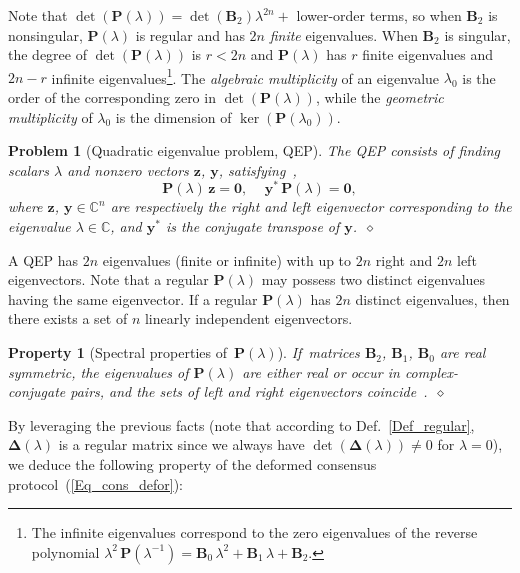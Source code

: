 \documentclass[letterpaper,9pt,twocolumn]{autart}
\newcommand{\vet}[1]{\ensuremath{{\mathbf #1}}}
\newtheorem{problem}{\textbf{Problem}}
\newtheorem{property}{\textbf{Property}}
\begin{document}
Note that $\det(\vet{P}(\lambda)) = \det(\vet{B}_2)\lambda^{2n} +$
lower-order terms, so when $\vet{B}_2$ is nonsingular, $\vet{P}(\lambda)$ is regular and has
$2n$ \emph{finite} eigenvalues. When $\vet{B}_2$ is singular, the degree of
$\det(\vet{P}(\lambda))$ is $r < 2n$ and $\vet{P}(\lambda)$ has $r$ finite eigenvalues and
$2n - r$ infinite eigenvalues\footnote{The infinite eigenvalues correspond to the zero eigenvalues
of the reverse polynomial $\lambda^2\,\vet{P}(\lambda^{-1}) =
\vet{B}_0\,\lambda^2 + \vet{B}_1\,\lambda + \vet{B}_2$.}.
The \emph{algebraic multiplicity} of an eigenvalue $\lambda_0$ is the order of the corresponding
zero in $\det(\vet{P}(\lambda))$, while the \emph{geometric multiplicity} of
$\lambda_0$ is the dimension of $\ker(\vet{P}(\lambda_0))$.

\begin{problem}[Quadratic eigenvalue problem, QEP]
The QEP consists of finding scalars $\lambda$ and nonzero vectors $\vet{z}$, $\vet{y}$,
satisfying~\cite{TisseurMe_SIAM01},
$$
\vet{P}(\lambda)\,\vet{z} = \vet{0},\quad \,\vet{y}^*\,\vet{P}(\lambda) = \vet{0},
$$
where $\vet{z}$, $\vet{y} \in \mathbb{C}^n$ are respectively the right and left eigenvector corresponding
to the eigenvalue $\lambda \in \mathbb{C}$, and $\vet{y}^*$ is the conjugate transpose of $\vet{y}$.~\hfill$\diamond$
\end{problem}

A QEP has $2n$ eigenvalues (finite or infinite) with up to $2n$ right and $2n$ left eigenvectors.
Note that a regular $\vet{P}(\lambda)$ may possess two distinct eigenvalues having the same eigenvector.
If a regular $\vet{P}(\lambda)$ has $2n$ distinct eigenvalues, then there exists a set
of $n$ linearly independent eigenvectors.


\begin{property}[Spectral properties of\, $\vet{P}(\lambda)$]\label{Prop_Q_lambda}
If~matrices $\vet{B}_2$, $\vet{B}_1$, $\vet{B}_0$ are \emph{real symmetric}, the eigenvalues of $\vet{P}(\lambda)$
are either real or occur in complex-conjugate pairs, and the sets of
left and right eigenvectors coincide~\cite{TisseurMe_SIAM01}.~\hfill$\diamond$
\end{property}

By leveraging the previous facts (note that according to Def.~\ref{Def_regular}, 
$\boldsymbol{\Delta}(\lambda)$ is a regular matrix since we always
have $\det(\boldsymbol{\Delta}(\lambda)) \neq 0$ for $\lambda = 0$),
we deduce the following property of
the deformed consensus protocol~(\ref{Eq_cons_defor}):
\end{document}
